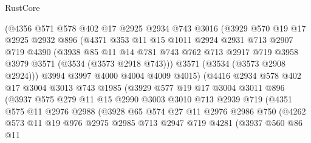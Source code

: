 \begin{lexlean}{RustCore}
\begin{coremodule}
            (@4356
              @571
              @578
              @402
              @17
              @2925
              @2934
              @743
              @3016
              (@3929
                @570
                @19
                @17
                @2925
                @2932
                @896
                (@4371
                  @353
                  @11
                  @15
                  @1011
                  @2924
                  @2931
                  @713
                  @2907
                  @719
                  @4390
                  (@3938
                    @85
                    @11
                    @14
                    @781
                    @743
                    @762
                    @713
                    @2917
                    @719
                    @3958
                    @3979
                    @3571
                    (@3534 (@3573 @2918 @743)))
                  @3571
                  (@3534 (@3573 @2908 @2924)))
                @3994
                @3997
                @4000
                @4004
                @4009
                @4015)
              (@4416
                @2934
                @578
                @402
                @17
                @3004
                @3013
                @743
                @1985
                (@3929
                  @577
                  @19
                  @17
                  @3004
                  @3011
                  @896
                  (@3937
                    @575
                    @279
                    @11
                    @15
                    @2990
                    @3003
                    @3010
                    @713
                    @2939
                    @719
                    (@4351
                      @575
                      @11
                      @2976
                      @2988
                      (@3928
                        @65
                        @574
                        @27
                        @11
                        @2976
                        @2986
                        @750
                        (@4262
                          @573
                          @11
                          @19
                          @976
                          @2975
                          @2985
                          @713
                          @2947
                          @719
                          @4281
                          (@3937
                            @560
                            @86
                            @11

\end{coremodule}
\end{lexlean}

